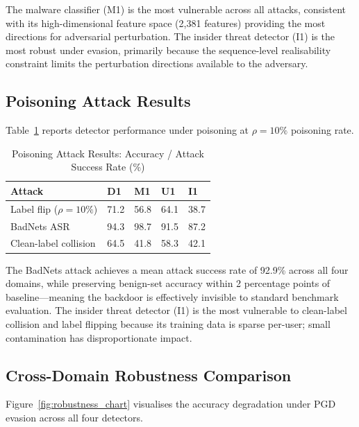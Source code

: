 \documentclass[sigconf,nonacm]{acmart}
\begin{document}
The malware classifier (M1) is the most vulnerable across all attacks,
consistent with its high-dimensional feature space (2{,}381 features)
providing the most directions for adversarial perturbation. The insider
threat detector (I1) is the most robust under evasion, primarily because the
sequence-level realisability constraint limits the perturbation directions
available to the adversary.

\subsection{Poisoning Attack Results}

Table~\ref{tab:poisoning} reports detector performance under poisoning at
$\rho = 10\%$ poisoning rate.

\begin{table}[h]
\caption{Poisoning Attack Results: Accuracy / Attack Success Rate (\%)}
\label{tab:poisoning}
\small
\begin{tabularx}{\columnwidth}{@{}p{1.7cm}*{4}{X}@{}}
\toprule
\textbf{Attack} & \textbf{D1} & \textbf{M1} & \textbf{U1} & \textbf{I1} \\
\midrule
Label flip ($\rho=10\%$) & 71.2 & 56.8 & 64.1 & 38.7 \\
BadNets ASR & 94.3 & 98.7 & 91.5 & 87.2 \\
Clean-label collision & 64.5 & 41.8 & 58.3 & 42.1 \\
\bottomrule
\end{tabularx}
\end{table}

The BadNets attack achieves a mean attack success rate of 92.9\% across all
four domains, while preserving benign-set accuracy within 2 percentage points
of baseline---meaning the backdoor is effectively invisible to standard
benchmark evaluation. The insider threat detector (I1) is the most vulnerable
to clean-label collision and label flipping because its training data is
sparse per-user; small contamination has disproportionate impact.

\subsection{Cross-Domain Robustness Comparison}

Figure~\ref{fig:robustness_chart} visualises the accuracy degradation under
PGD evasion across all four detectors.
\end{document}
